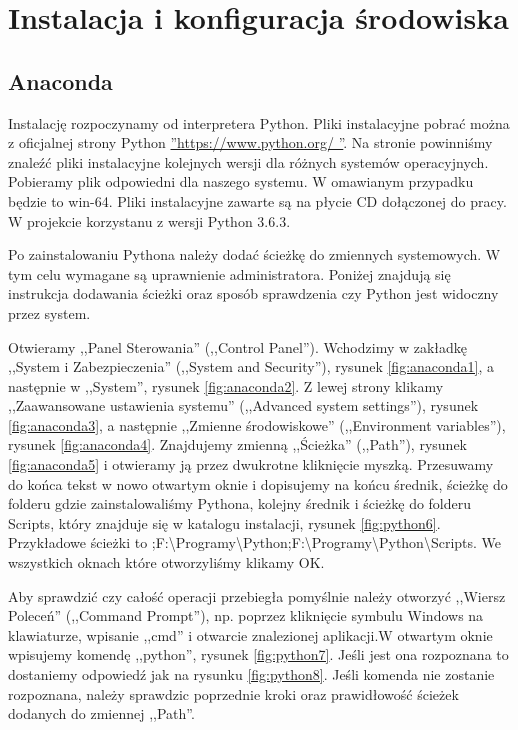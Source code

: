 \section{Instalacja i konfiguracja środowiska}
\label{sec:instalacja}

\subsection{Anaconda}
\label{sec:anaconda}

Instalację rozpoczynamy od interpretera Python. Pliki instalacyjne pobrać można z oficjalnej strony Python \hyperref[python]{''https://www.python.org/ ''}. Na stronie powinniśmy znaleźć pliki instalacyjne kolejnych wersji dla różnych systemów operacyjnych. Pobieramy plik odpowiedni dla naszego systemu. W omawianym przypadku będzie to win-64. Pliki instalacyjne zawarte są na płycie CD dołączonej do pracy. W projekcie korzystanu z wersji Python 3.6.3.

Po zainstalowaniu Pythona należy dodać ścieżkę do zmiennych systemowych. W tym celu wymagane są uprawnienie administratora. Poniżej znajdują się instrukcja dodawania ścieżki oraz sposób sprawdzenia czy Python jest widoczny przez system.

Otwieramy ,,Panel Sterowania'' (,,Control Panel''). Wchodzimy w zakładkę ,,System i Zabezpieczenia'' (,,System and Security''), rysunek \ref{fig:anaconda1}, a następnie w ,,System'', rysunek \ref{fig:anaconda2}. Z lewej strony klikamy ,,Zaawansowane ustawienia systemu'' (,,Advanced system settings''), rysunek \ref{fig:anaconda3}, a następnie
,,Zmienne środowiskowe'' (,,Environment variables''), rysunek \ref{fig:anaconda4}. Znajdujemy zmienną ,,Ścieżka'' (,,Path''), rysunek \ref{fig:anaconda5} i otwieramy ją przez dwukrotne kliknięcie myszką. Przesuwamy do końca tekst w nowo otwartym oknie i dopisujemy na końcu średnik, ścieżkę do folderu gdzie zainstalowaliśmy Pythona, kolejny średnik i ścieżkę do folderu Scripts, który znajduje się w katalogu instalacji, rysunek \ref{fig:python6}. Przykładowe ścieżki to ;F:\textbackslash Programy\textbackslash Python;F:\textbackslash Programy\textbackslash Python\textbackslash Scripts. We wszystkich oknach które otworzyliśmy klikamy OK.

Aby sprawdzić czy całość operacji przebiegła pomyślnie należy otworzyć ,,Wiersz Poleceń'' (,,Command Prompt''), np. poprzez kliknięcie symbulu Windows na klawiaturze, wpisanie ,,cmd'' i otwarcie znalezionej aplikacji.W otwartym oknie wpisujemy komendę ,,python'', rysunek \ref{fig:python7}.  Jeśli jest ona rozpoznana to dostaniemy odpowiedź jak na rysunku \ref{fig:python8}. Jeśli komenda nie zostanie rozpoznana, należy sprawdzic poprzednie kroki oraz prawidłowość ścieżek dodanych do zmiennej ,,Path''.

